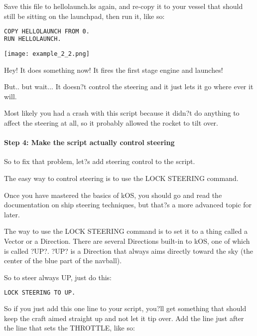 Save this file to hellolaunch.ks again, and re-copy it to your vessel that should still be sitting on the launchpad, then run it, like so:

\begin{lstlisting}[frame=single,language=XML]
COPY HELLOLAUNCH FROM 0.
RUN HELLOLAUNCH.
\end{lstlisting} 

\begin{center}
\texttt{[image: example\_2\_2.png]}
\end{center}

Hey! It does something now! It fires the first stage engine and launches!

But.. but wait... It doesn?t control the steering and it just lets it go where ever it will.

Most likely you had a crash with this script because it didn?t do anything to affect the steering at all, so it probably allowed the rocket to tilt over.

\paragraph{Step 4: Make the script actually control steering}
So to fix that problem, let?s add steering control to the script.

The easy way to control steering is to use the LOCK STEERING command.

Once you have mastered the basics of kOS, you should go and read the documentation on ship steering techniques, but that?s a more advanced topic for later.

The way to use the LOCK STEERING command is to set it to a thing called a Vector or a Direction. There are several Directions built-in to kOS, one of which is called ?UP?. ?UP? is a Direction that always aims directly toward the sky (the center of the blue part of the navball).

So to steer always UP, just do this:

\begin{lstlisting}[frame=single,language=XML]
LOCK STEERING TO UP.
\end{lstlisting} 

So if you just add this one line to your script, you?ll get something that should keep the craft aimed straight up and not let it tip over. Add the line just after the line that sets the THROTTLE, like so:

